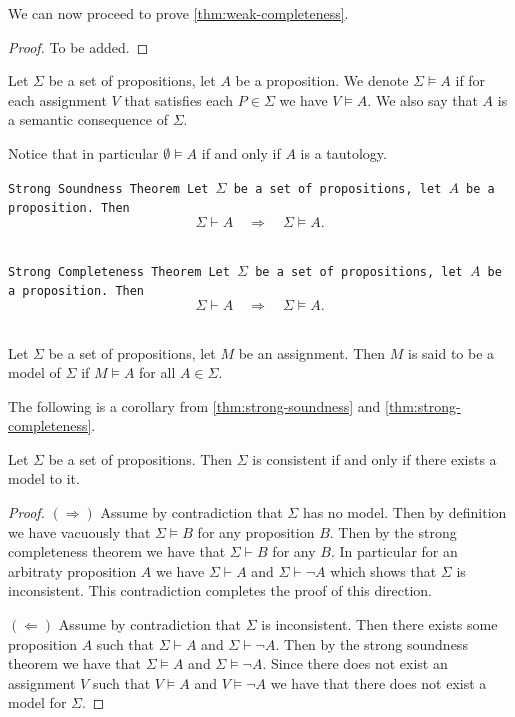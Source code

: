\documentclass[11pt,a4paper]{article}
\DeclareRobustCommand{\models}{%
  \mathrel{\vDash}%
}
\begin{document}
We can now proceed to prove \autoref{thm:weak-completeness}.
\begin{proof}
  To be added.
\end{proof}

\begin{definition}
  Let $\Sigma$ be a set of propositions, let $A$ be a proposition.
  We denote $\Sigma \models A$ if for each assignment $V$ that satisfies
  each $P \in \Sigma$ we have $V \models A$. We also say that $A$ is
  a semantic consequence of $\Sigma$.
\end{definition}
\begin{remark}
  Notice that in particular $\emptyset \models A$ if and only if $A$
  is a tautology.
\end{remark}

\begin{theorem}\label{thm:strong-soundness}\tt{Strong Soundness Theorem}
  Let $\Sigma$ be a set of propositions, let $A$ be a proposition.
  Then
  \[
    \Sigma \vdash A \quad\Rightarrow\quad \Sigma \models A.
  \]
\end{theorem}

\begin{theorem}\label{thm:strong-completeness}
  \tt{Strong Completeness Theorem}
  Let $\Sigma$ be a set of propositions, let $A$ be a proposition.
  Then
  \[
    \Sigma \vdash A \quad\Rightarrow\quad \Sigma \models A.
  \]
\end{theorem}

\begin{definition}[Model]
  Let $\Sigma$ be a set of propositions, let $M$ be an assignment.
  Then $M$ is said to be a model of $\Sigma$ if $M \models A$ 
  for all $A \in \Sigma$.
\end{definition}

The following is a corollary from \autoref{thm:strong-soundness}
and \autoref{thm:strong-completeness}.
\begin{corollary}
  Let $\Sigma$ be a set of propositions.
  Then $\Sigma$ is consistent if and only if there exists a model to it.
\end{corollary}
\begin{proof}
  $(\Rightarrow)$ Assume by contradiction that $\Sigma$ has no model.
  Then by definition we have vacuously that $\Sigma \models B$ for
  any proposition $B$. Then by the strong completeness theorem we have
  that $\Sigma \vdash B$ for any $B$. In particular for an arbitraty
  proposition $A$ we have $\Sigma \vdash A$ and $\Sigma \vdash \neg A$
  which shows that $\Sigma$ is inconsistent. This contradiction completes
  the proof of this direction.

  $(\Leftarrow)$ Assume by contradiction that $\Sigma$ is inconsistent.
  Then there exists some proposition $A$ such that $\Sigma \vdash A$
  and $\Sigma \vdash \neg A$. Then by the strong soundness theorem
  we have that $\Sigma \models A$ and $\Sigma \models \neg A$.
  Since there does not exist an assignment $V$ such that $V \models A$
  and $V \models \neg A$ we have that there does not exist a model
  for $\Sigma$.
\end{proof}
\end{document}

